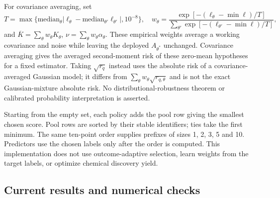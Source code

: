 For covariance averaging, set
\begin{equation}
T=\max\{\mathrm{median}_\theta|\ell_\theta-\mathrm{median}_{\theta'}\ell_{\theta'}|,10^{-8}\},
\quad w_\theta=\frac{\exp[-(\ell_\theta-\min\ell)/T]}{\sum_{\theta'}\exp[-(\ell_{\theta'}-\min\ell)/T]},
\end{equation}
and $\overline K=\sum_\theta w_\theta K_\theta$, $\nu=\sum_\theta w_\theta\alpha_\theta$. These empirical weights average a working covariance and noise while leaving the deployed $A_{\theta^*}$ unchanged. Covariance averaging gives the averaged second-moment risk of these zero-mean hypotheses for a fixed estimator. Taking $\sqrt{r_q}$ instead uses the absolute risk of a covariance-averaged Gaussian model; it differs from $\sum_\theta w_\theta\sqrt{r_{q,\theta}}$ and is not the exact Gaussian-mixture absolute risk. No distributional-robustness theorem or calibrated probability interpretation is asserted.

Starting from the empty set, each policy adds the pool row giving the smallest chosen score. Pool rows are sorted by their stable identifiers; ties take the first minimum. The same ten-point order supplies prefixes of sizes 1, 2, 3, 5 and 10. Predictors use the chosen labels only after the order is computed. This implementation does not use outcome-adaptive selection, learn weights from the target labels, or optimize chemical discovery yield.

\subsection{Current results and numerical checks}





